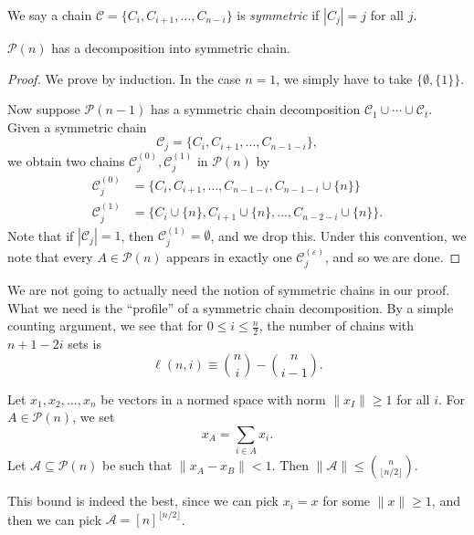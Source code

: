 \documentclass[a4paper]{article}
\begin{document}
\begin{defi}
  We say a chain $\mathcal{C} = \{C_i, C_{i + 1}, \ldots, C_{n - i}\}$ is \emph{symmetric} if $|C_j| = j$ for all $j$.
\end{defi}

\begin{thm}
  $\mathcal{P}(n)$ has a decomposition into symmetric chain.
\end{thm}

\begin{proof}
  We prove by induction. In the case $n = 1$, we simply have to take $\{\emptyset, \{1\}\}$.

  Now suppose $\mathcal{P}(n- 1)$ has a symmetric chain decomposition $\mathcal{C}_1 \cup \cdots \cup \mathcal{C}_t$. Given a symmetric chain
  \[
    \mathcal{C}_j = \{C_i, C_{i + 1}, \ldots, C_{n - 1 - i}\},
  \]
  we obtain two chains $\mathcal{C}_j^{(0)}, \mathcal{C}_j^{(1)}$ in $\mathcal{P}(n)$ by
  \begin{align*}
    \mathcal{C}_j^{(0)} &= \{C_i, C_{i + 1}, \ldots, C_{n - 1 - i}, C_{n - 1 - i} \cup \{n\}\}\\
    \mathcal{C}_j^{(1)} &= \{C_i \cup\{n\}, C_{i + 1} \cup \{n\}, \ldots, C_{n - 2 - i} \cup \{n\}\}.
  \end{align*}
  Note that if $|\mathcal{C}_j| = 1$, then $\mathcal{C}_j^{(1)} = \emptyset$, and we drop this. Under this convention, we note that every $A \in \mathcal{P}(n)$ appears in exactly one $\mathcal{C}_j^{(\varepsilon)}$, and so we are done.
\end{proof}

We are not going to actually need the notion of symmetric chains in our proof. What we need is the ``profile'' of a symmetric chain decomposition. By a simple counting argument, we see that for $0 \leq i \leq \frac{n}{2}$, the number of chains with $n + 1 - 2i$ sets is
\[
  \ell(n, i) \equiv \binom{n}{i} - \binom{n}{i - 1}.
\]
\begin{thm}[Kleitman, 1970]
  Let $x_1, x_2, \ldots, x_n$ be vectors in a normed space with norm $\|x_I\| \geq 1$ for all $i$. For $A \in \mathcal{P}(n)$, we set
  \[
    x_A = \sum_{i \in A} x_i.
  \]
  Let $\mathcal{A} \subseteq \mathcal{P}(n)$ be such that $\|x_A - x_B\|< 1$. Then $\|\mathcal{A}\| \leq \binom{n}{\lfloor n/2\rfloor}$.
\end{thm}
This bound is indeed the best, since we can pick $x_i = x$ for some $\|x\| \geq 1$, and then we can pick $\mathcal{A} = [n]^{\lfloor n/2\rfloor}$.
\end{document}
